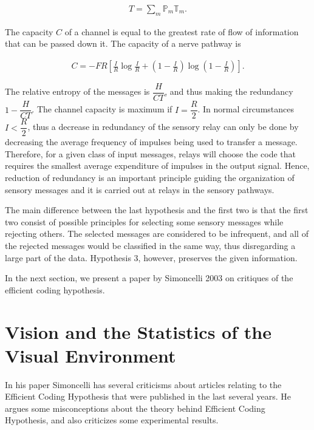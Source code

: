 \documentclass[twoside]{article}
\begin{document}
\begin{multicols}{2}
\begin{align} \label{eq:2}
	T = \sum_m \mathbb{P}_m \mathbb{T}_m.
\end{align}

The capacity $C$ of a channel is equal to the greatest rate of flow of information that can be passed down it. The capacity of a nerve pathway is

\begin{align} \label{eq:3}
	C = - FR \left[\frac{I}{R} \log \frac{I}{R} +\left(1-\frac{I}{R} \right) \log  \left(1-\frac{I}{R} \right) \right].
\end{align}

The relative entropy of the messages is $\dfrac{H}{CT}$, and thus making the redundancy $1-\dfrac{H}{CT}$. The channel capacity is maximum if $I = \dfrac{R}2$. In normal circumstances $I < \dfrac{R}{2}$, thus a decrease in redundancy of the sensory relay can only be done by decreasing the average frequency of impulses being used to transfer a message. Therefore, for a given class of input messages, relays will choose the code that requires the smallest average expenditure of impulses in the output signal. Hence, reduction of redundancy is an important principle guiding the organization of sensory messages and it is carried out at relays in the sensory pathways.

The main difference between the last hypothesis and the first two is that the first two consist of possible principles for selecting some sensory messages while rejecting others. The selected messages are considered to be infrequent, and all of the rejected messages would be classified in the same way, thus disregarding a large part of the data. Hypothesis 3, however, preserves the given information.

In the next section, we present a paper by Simoncelli 2003 on critiques of the efficient coding hypothesis. 







\section{Vision and the Statistics of the Visual Environment}

In his paper Simoncelli has several criticisms about articles relating to the Efficient Coding Hypothesis that were published in the last several years. He argues some misconceptions about the theory behind Efficient Coding Hypothesis, and also criticizes some experimental results.


\end{multicols}
\end{document}
